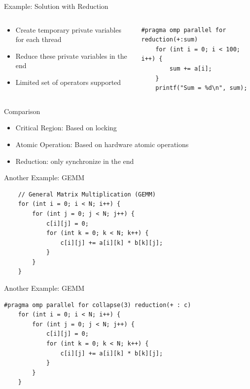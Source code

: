 \begin{frame}[fragile]{Example: Solution with Reduction}
\begin{columns}[T]
    \begin{column}{0.45\textwidth}
        \begin{itemize}
            \item Create temporary private variables for each thread
            \item Reduce these private variables in the end
            \item Limited set of operators supported
        \end{itemize}
    \end{column}
    \begin{column}{0.55\textwidth}
\begin{verbatim}
#pragma omp parallel for reduction(+:sum)
    for (int i = 0; i < 100; i++) {
        sum += a[i];
    }
    printf("Sum = %d\n", sum);
\end{verbatim}
    \end{column}
\end{columns}
\end{frame}

\begin{frame}[fragile]{Comparison}
\begin{itemize}
    \item Critical Region: Based on locking
    \item Atomic Operation: Based on hardware atomic operations
    \item Reduction: only synchronize in the end

\end{itemize}
\end{frame}

\begin{frame}[fragile]{Another Example: GEMM}
    \begin{verbatim}
    // General Matrix Multiplication (GEMM)
    for (int i = 0; i < N; i++) {
        for (int j = 0; j < N; j++) {
            c[i][j] = 0;
            for (int k = 0; k < N; k++) {
                c[i][j] += a[i][k] * b[k][j];
            }
        }
    }
    \end{verbatim}
\end{frame}

\begin{frame}[fragile]{Another Example: GEMM}
    \begin{verbatim}
#pragma omp parallel for collapse(3) reduction(+ : c)
    for (int i = 0; i < N; i++) {
        for (int j = 0; j < N; j++) {
            c[i][j] = 0;
            for (int k = 0; k < N; k++) {
                c[i][j] += a[i][k] * b[k][j];
            }
        }
    }
    \end{verbatim}
\end{frame}